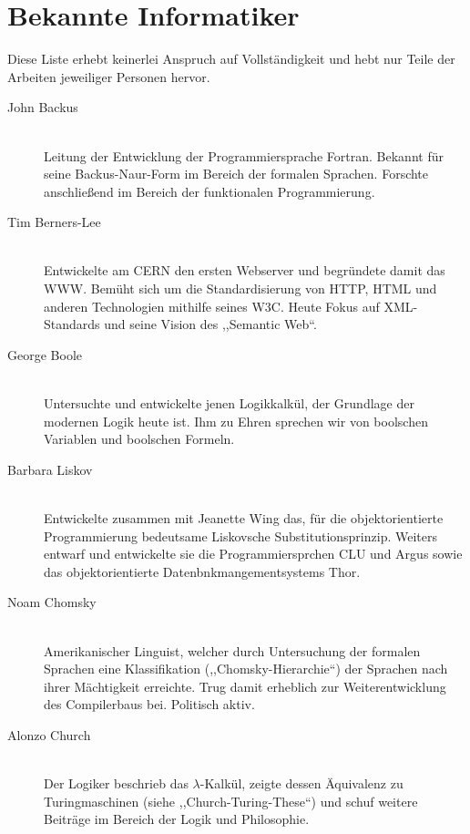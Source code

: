 \chapter{Bekannte Informatiker}
%
Diese Liste erhebt keinerlei Anspruch auf Vollständigkeit und hebt nur Teile der Arbeiten jeweiliger Personen hervor.
%
\begin{description}
  \item[John Backus ] \hfill{} \\
    Leitung der Entwicklung der Programmiersprache Fortran.
    Bekannt für seine Backus-Naur-Form im Bereich der formalen Sprachen.
    Forschte anschließend im Bereich der funktionalen Programmierung.

   \item[Tim Berners-Lee ] \hfill{} \\
    Entwickelte am CERN den ersten Webserver und begründete damit das WWW.
    Bemüht sich um die Standardisierung von HTTP, HTML und anderen Technologien mithilfe seines W3C.
    Heute Fokus auf XML-Standards und seine Vision des ,,Semantic Web``.

  \item[George Boole ] \hfill{} \\
    Untersuchte und entwickelte jenen Logikkalkül, der Grundlage der modernen Logik heute ist.
    Ihm zu Ehren sprechen wir von boolschen Variablen und boolschen Formeln.

  \item[Barbara Liskov ] \hfill{} \\
    Entwickelte zusammen mit Jeanette Wing das, für die objektorientierte Programmierung bedeutsame Liskovsche Substitutionsprinzip.
    Weiters entwarf und entwickelte sie die Programmiersprchen CLU und Argus sowie das objektorientierte Datenbnkmangementsystems Thor.

  \item[Noam Chomsky ] \hfill{} \\
    Amerikanischer Linguist, welcher durch Untersuchung der formalen Sprachen eine Klassifikation (,,Chomsky-Hierarchie``) der Sprachen nach ihrer Mächtigkeit erreichte.
    Trug damit erheblich zur Weiterentwicklung des Compilerbaus bei.
    Politisch aktiv.

  \item[Alonzo Church ] \hfill{} \\
    Der Logiker beschrieb das $\lambda$-Kalkül, zeigte dessen Äquivalenz zu Turingmaschinen (siehe ,,Church-Turing-These``) und schuf weitere Beiträge im Bereich der Logik und Philosophie.


\end{description}
